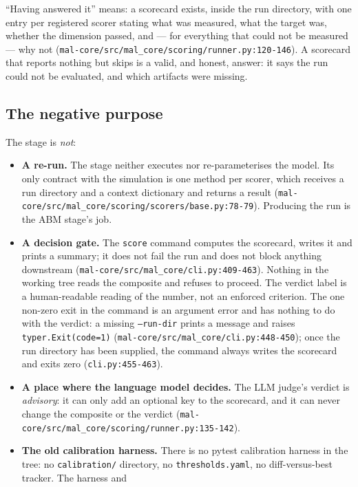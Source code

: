 \documentclass[11pt,a4paper]{article}
\newcommand{\code}[1]{\texttt{#1}}
\begin{document}
``Having answered it'' means: a scorecard exists, inside the run directory,
with one entry per registered scorer stating what was measured, what the
target was, whether the dimension passed, and --- for everything that could
not be measured --- why not
(\code{mal-core/src/mal\_core/scoring/runner.py:120-146}). A scorecard that
reports nothing but skips is a valid, and honest, answer: it says the run
could not be evaluated, and which artifacts were missing.

\subsection{The negative purpose}

The stage is \emph{not}:

\begin{itemize}
\item \textbf{A re-run.} The stage neither executes nor re-parameterises the
      model. Its only contract with the simulation is one method per scorer,
      which receives a run directory and a context dictionary and returns a
      result
      (\code{mal-core/src/mal\_core/scoring/scorers/base.py:78-79}).
      Producing the run is the ABM stage's job.
\item \textbf{A decision gate.} The \code{score} command computes the
      scorecard, writes it and prints a summary; it does not fail the run
      and does not block anything downstream
      (\code{mal-core/src/mal\_core/cli.py:409-463}). Nothing in the working
      tree reads the composite and refuses to proceed. The verdict label is
      a human-readable reading of the number, not an enforced criterion.
      The one non-zero exit in the command is an argument error and has
      nothing to do with the verdict: a missing \code{--run-dir} prints a
      message and raises \code{typer.Exit(code=1)}
      (\code{mal-core/src/mal\_core/cli.py:448-450}); once the run directory
      has been supplied, the command always writes the scorecard and exits
      zero (\code{cli.py:455-463}).
\item \textbf{A place where the language model decides.} The LLM judge's
      verdict is \emph{advisory}: it can only add an optional key to the
      scorecard, and it can never change the composite or the verdict
      (\code{mal-core/src/mal\_core/scoring/runner.py:135-142}).
\item \textbf{The old calibration harness.} There is no pytest calibration
      harness in the tree: no \code{calibration/} directory, no
      \code{thresholds.yaml}, no diff-versus-best tracker. The harness and

\end{itemize}
\end{document}

